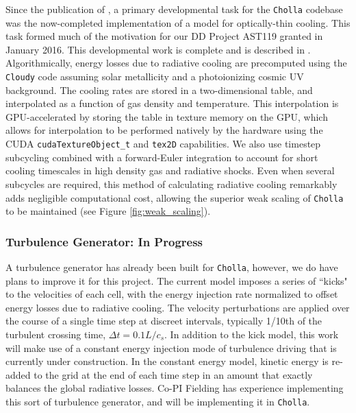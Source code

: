 \documentclass[11pt,letterpaper,english]{article}
\begin{document}
Since the publication of \cite{Schneider15}, a primary developmental task for the {\tt Cholla} codebase was
 the now-completed implementation of a model for optically-thin cooling. This task formed much of the motivation for
our DD Project AST119 granted in January 2016. This developmental work is complete and is
described in \cite{Schneider17}. Algorithmically, energy losses due to radiative cooling are precomputed using the
{\tt Cloudy} code \cite{Ferland13} assuming solar metallicity and a photoionizing
cosmic UV background. The cooling rates are stored in a two-dimensional table,
and interpolated as a function of gas density and temperature. This interpolation 
is GPU-accelerated by storing the table in texture memory on the GPU, which allows
for interpolation to be performed natively by the hardware using the CUDA {\tt cudaTextureObject\_t} and {\tt tex2D} capabilities.
We also use timestep subcycling combined with a forward-Euler integration to account for short cooling timescales in high density gas and radiative shocks. Even when several subcycles are required, this method of calculating radiative cooling remarkably adds negligible computational cost, allowing the superior
weak scaling of {\tt Cholla} to be maintained (see Figure \ref{fig:weak_scaling}).

\vspace{-.2in}
\subsubsection{Turbulence Generator: In Progress}
\vspace{-.25in}

A turbulence generator has already been built for {\tt Cholla}, however, we do have plans to improve it for this project. The current model imposes a series of ``kicks" to the velocities of each cell, with the energy injection rate normalized to offset energy losses due to radiative cooling. The velocity perturbations are applied over the course of a single time step at discreet intervals, typically 1/10th of the turbulent crossing time, $\Delta t = 0.1 L / c_s$. In addition to the kick model, this work will make use of a constant energy injection mode of turbulence driving that is currently under construction. In the constant energy model, kinetic energy is re-added to the grid at the end of each time step in an amount that exactly balances the global radiative losses. Co-PI Fielding has experience implementing this sort of turbulence generator, and will be implementing it in {\tt Cholla}.
\end{document}
